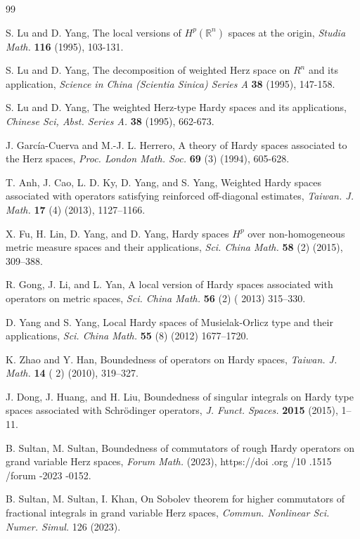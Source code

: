 \documentclass[oneside,reqno]{amsart}
\numberwithin{equation}{section}
\theoremstyle{definition}
\begin{document}
\begin{thebibliography}{99}
 
  S. Lu and D. Yang, The local versions of $H^p(\mathbb{R}^n)$ spaces at the origin, \textit{Studia Math.} {\bf 116} (1995), 103-131.
  
   S. Lu and D. Yang, The decomposition of weighted Herz space on $R^n$ and its application, \textit{Science in China (Scientia Sinica) Series A} {\bf 38} (1995), 147-158. 
   
    S. Lu and D. Yang, The weighted Herz-type Hardy spaces and its applications, \textit{Chinese Sci, Abst. Series A.} {\bf 38} (1995), 662-673. 
    
  


 J. Garc\'ia-Cuerva and M.-J. L. Herrero, A theory of Hardy spaces associated to the Herz spaces, \textit{Proc. London Math. Soc.} {\bf  69} (3) (1994), 605-628.


T. Anh, J. Cao, L. D. Ky, D. Yang, and S. Yang, Weighted Hardy spaces associated with operators satisfying reinforced off-diagonal estimates,\textit{ Taiwan. J. Math.}  {\bf 17} (4) (2013), 1127–1166.

X. Fu, H. Lin, D. Yang, and D. Yang, Hardy spaces $H^p$ over non-homogeneous metric measure spaces and their applications, \textit{Sci. China Math.}  {\bf 58} (2) (2015), 309–388.

R. Gong, J. Li, and L. Yan, A local version of Hardy spaces associated with operators on metric spaces, \textit{Sci. China Math.} {\bf 56} (2) ( 2013) 315–330.

D. Yang and S. Yang, Local Hardy spaces of Musielak-Orlicz type and their applications, \textit{Sci. China Math.} {\bf 55} (8) (2012) 1677–1720.

K. Zhao and Y. Han, Boundedness of operators on Hardy spaces, \textit{Taiwan. J. Math.} {\bf 14} ( 2) (2010), 319–327.

J. Dong, J. Huang, and H. Liu, Boundedness of singular integrals on Hardy type spaces associated with Schr\"odinger operators, \textit{J. Funct. Spaces.} {\bf 2015} (2015),  1–11.




B. Sultan, M. Sultan, Boundedness of commutators of rough Hardy operators on grand variable Herz spaces, \textit{Forum Math.} (2023), https://doi .org /10 .1515 /forum -2023 -0152.



B. Sultan, M. Sultan, I. Khan, On Sobolev theorem for higher commutators of fractional integrals in grand variable Herz spaces, \textit{Commun. Nonlinear Sci. Numer. Simul.} 126 (2023).


\end{thebibliography}
\end{document}
